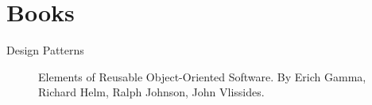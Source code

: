 \section{Books}
\begin{description}
 \item[Design Patterns] Elements of Reusable Object-Oriented Software. By Erich Gamma, Richard Helm, Ralph Johnson, John Vlissides.
\end{description}
